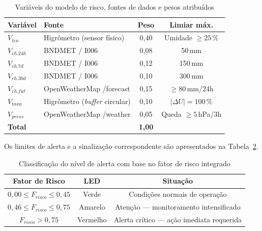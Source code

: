 \begin{table}[htb]
\centering
\caption{Variáveis do modelo de risco, fontes de dados e pesos atribuídos}
\label{tab:pesos}
\begin{tabular}{llcc}
\hline
\textbf{Variável} & \textbf{Fonte}                & \textbf{Peso} & \textbf{Limiar máx.} \\
\hline
$V_{len}$         & Higrômetro (sensor físico)    & 0,40          & Umidade $\geq 25\,\%$ \\
$V_{ch.24h}$      & BNDMET / I006                 & 0,08          & 50\,mm               \\
$V_{ch.7d}$       & BNDMET / I006                 & 0,12          & 150\,mm              \\
$V_{ch.30d}$      & BNDMET / I006                 & 0,10          & 300\,mm              \\
$V_{ch.fut}$      & OpenWeatherMap /forecast      & 0,15          & $\geq 80$\,mm/24h    \\
$V_{taxa}$        & Higrômetro (\textit{buffer} circular) & 0,10 & $|\Delta U| = 100\,\%$ \\
$V_{press}$       & OpenWeatherMap /weather       & 0,05          & Queda $\geq 5$\,hPa/3h \\
\hline
\textbf{Total}    &                               & \textbf{1,00} &                      \\
\hline
\end{tabular}
\end{table}

Os limites de alerta e a sinalização correspondente são apresentados
na Tabela~\ref{tab:alertas}.

\begin{table}[htb]
\centering
\caption{Classificação do nível de alerta com base no fator de risco integrado}
\label{tab:alertas}
\begin{tabular}{ccc}
\hline
\textbf{Fator de Risco} & \textbf{LED} & \textbf{Situação}                       \\
\hline
$0{,}00 \leq F_{risco} \leq 0{,}45$ & Verde   & Condições normais de operação           \\
$0{,}46 \leq F_{risco} \leq 0{,}75$ & Amarelo & Atenção — monitoramento intensificado   \\
$F_{risco} > 0{,}75$                 & Vermelho & Alerta crítico — ação imediata requerida \\
\hline
\end{tabular}
\end{table}

